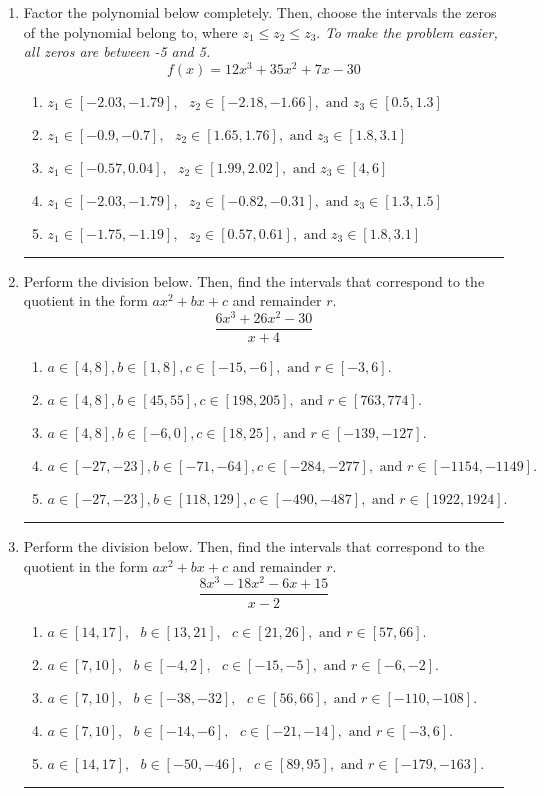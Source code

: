 \documentclass[14pt]{extbook}
\newcommand{\litem}[1]{\item#1\hspace*{-1cm}\rule{\textwidth}{0.4pt}}
\begin{document}
\begin{enumerate}
{\begin{enumerate}[label=\Alph*.]
\end{enumerate} }
\litem{
Factor the polynomial below completely. Then, choose the intervals the zeros of the polynomial belong to, where $z_1 \leq z_2 \leq z_3$. \textit{To make the problem easier, all zeros are between -5 and 5.}\[ f(x) = 12x^{3} +35 x^{2} +7 x -30 \]\begin{enumerate}[label=\Alph*.]
\item \( z_1 \in [-2.03, -1.79], \text{   }  z_2 \in [-2.18, -1.66], \text{   and   } z_3 \in [0.5, 1.3] \)
\item \( z_1 \in [-0.9, -0.7], \text{   }  z_2 \in [1.65, 1.76], \text{   and   } z_3 \in [1.8, 3.1] \)
\item \( z_1 \in [-0.57, 0.04], \text{   }  z_2 \in [1.99, 2.02], \text{   and   } z_3 \in [4, 6] \)
\item \( z_1 \in [-2.03, -1.79], \text{   }  z_2 \in [-0.82, -0.31], \text{   and   } z_3 \in [1.3, 1.5] \)
\item \( z_1 \in [-1.75, -1.19], \text{   }  z_2 \in [0.57, 0.61], \text{   and   } z_3 \in [1.8, 3.1] \)

\end{enumerate} }
\litem{
Perform the division below. Then, find the intervals that correspond to the quotient in the form $ax^2+bx+c$ and remainder $r$.\[ \frac{6x^{3} +26 x^{2} -30}{x + 4} \]\begin{enumerate}[label=\Alph*.]
\item \( a \in [4, 8], b \in [1, 8], c \in [-15, -6], \text{ and } r \in [-3, 6]. \)
\item \( a \in [4, 8], b \in [45, 55], c \in [198, 205], \text{ and } r \in [763, 774]. \)
\item \( a \in [4, 8], b \in [-6, 0], c \in [18, 25], \text{ and } r \in [-139, -127]. \)
\item \( a \in [-27, -23], b \in [-71, -64], c \in [-284, -277], \text{ and } r \in [-1154, -1149]. \)
\item \( a \in [-27, -23], b \in [118, 129], c \in [-490, -487], \text{ and } r \in [1922, 1924]. \)

\end{enumerate} }
\litem{
Perform the division below. Then, find the intervals that correspond to the quotient in the form $ax^2+bx+c$ and remainder $r$.\[ \frac{8x^{3} -18 x^{2} -6 x + 15}{x -2} \]\begin{enumerate}[label=\Alph*.]
\item \( a \in [14, 17], \text{   } b \in [13, 21], \text{   } c \in [21, 26], \text{   and   } r \in [57, 66]. \)
\item \( a \in [7, 10], \text{   } b \in [-4, 2], \text{   } c \in [-15, -5], \text{   and   } r \in [-6, -2]. \)
\item \( a \in [7, 10], \text{   } b \in [-38, -32], \text{   } c \in [56, 66], \text{   and   } r \in [-110, -108]. \)
\item \( a \in [7, 10], \text{   } b \in [-14, -6], \text{   } c \in [-21, -14], \text{   and   } r \in [-3, 6]. \)
\item \( a \in [14, 17], \text{   } b \in [-50, -46], \text{   } c \in [89, 95], \text{   and   } r \in [-179, -163]. \)


\end{enumerate}}
\end{enumerate}
\end{document}
